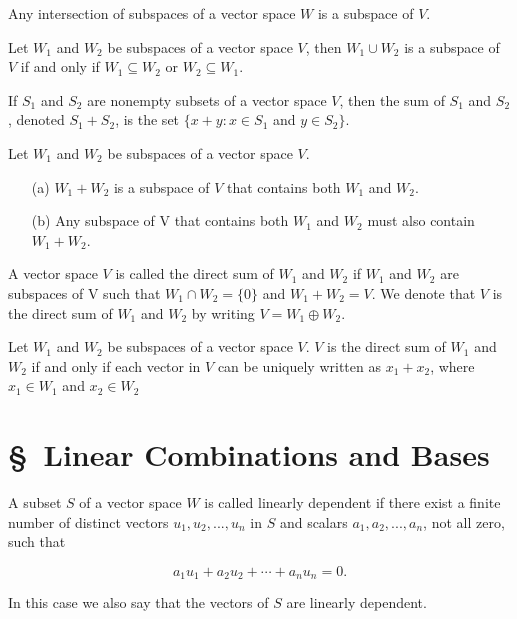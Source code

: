 \begin{thm}
 Any intersection of subspaces of a vector space $W$ is a subspace of $V$.
\end{thm}

\begin{thm}
	Let $W_1$ and $W_2$ be subspaces of a vector space $V$, then $W_1 \cup W_2$ is a subspace of $V$ if and only if $W_1 \subseteq W_2$ or $W_2 \subseteq W_1$. 
\end{thm}

\begin{defn}
	If $S_1$ and $S_2$ are nonempty subsets of a vector space $V$, then the sum of $S_1$ and $S_2$, denoted $S_1 + S_2$, is the set $\{x+y:x \in S_1$ and $y\in S_2\}$.
\end{defn}

\begin{thm}
	Let $W_1$ and $W_2$ be subspaces of a vector space $V$.
	\begin{itemize}
		\item[(a)] $W_1 + W_2$ is a subspace of $V$ that contains both $W_1$ and $W_2$.
		\item[(b)] Any subspace of V that contains both $W_1$ and $W_2$ must also contain $W_1 + W_2$. 
	\end{itemize}
\end{thm}

\begin{defn} A vector space $V$ is called the direct sum of $W_1$ and $W_2$ if $W_1$ and $W_2$ are subspaces of V such that $W_1 \cap W_2 = \{0\}$ and $W_1 + W_2 = V$. We denote that $V$ is the direct sum of $W_1$ and $W_2$ by writing $V = W_1 \oplus W_2$.
\end{defn}

\begin{thm}
	Let $W_1$ and $W_2$ be subspaces of a vector space $V$. $V$ is the direct sum of $W_1$ and $W_2$ if and only if each vector in $V$ can be uniquely written as $x_1 + x_2$, where $x_1 \in W_1$ and $x_2 \in W_2$
\end{thm}

\section*{\S\ Linear Combinations and Bases}

\begin{defn}
	A subset $S$ of a vector space $W$ is called linearly dependent if there exist a finite number of distinct vectors $u_1, u_2, . . . , u_n$ in $S$ and scalars $a_1,a_2,...,a_n$, not all zero, such that 
	
		$$a_1u_1 + a_2u_2 +\cdots +a_nu_n = 0 .$$
	
In this case we also say that the vectors of $S$ are linearly dependent.

\end{defn}

